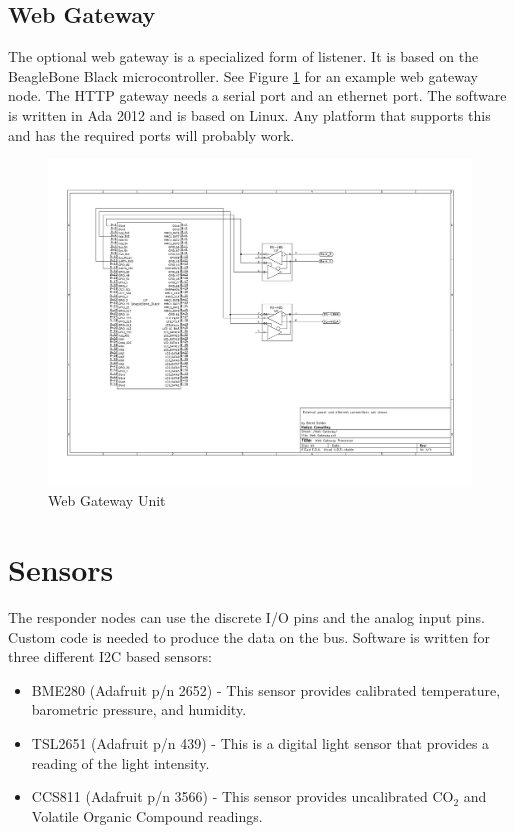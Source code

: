\documentclass[10pt]{article}
\begin{document}
\subsection{Web Gateway}
The optional web gateway is a specialized form of listener.  It is based on the BeagleBone Black microcontroller.  See Figure \ref{fig:gateway} for an example web gateway node.  The HTTP gateway needs a serial port and an ethernet port.  The software is written in Ada 2012 and is based on Linux.  Any platform that supports this and has the required ports will probably work.

\begin{figure}
  \centering
  \includegraphics[width=\textwidth]{WebGateway.pdf}
  \caption{Web Gateway Unit}
  \label{fig:gateway}
\end{figure}

\section{Sensors}
The responder nodes can use the discrete I/O pins and the analog input pins.  Custom code is needed to produce the data on the bus.  Software is written for three different I2C based sensors:

\begin{itemize}
  \item BME280 (Adafruit p/n 2652) - This sensor provides calibrated temperature, barometric pressure, and humidity.
  \item TSL2651 (Adafruit p/n 439) - This is a digital light sensor that provides a reading of the light intensity.
  \item CCS811 (Adafruit p/n 3566) - This sensor provides uncalibrated CO$_2$ and Volatile Organic Compound readings.
\end{itemize}
\end{document}
